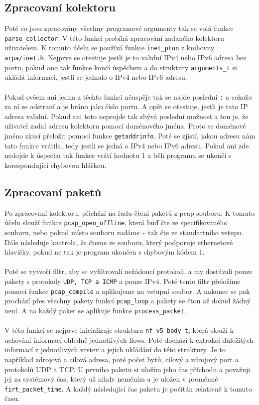 \documentclass[12pt]{article}
\begin{document}
\subsection{Zpracovaní kolektoru}
Poté co jsou zpracovány všechny programové argumenty tak se volá funkce \texttt{parse\_collector}. V této funkci probíhá zpracování zadaného kolektoru uživatelem.
K tomuto účelu se používá funkce \texttt{inet\_pton} z knihovny \texttt{arpa/inet.h}. Nejprve se otestuje jestli je to validní IPv4 nebo IPv6 adresa bez portu, pokud ano
tak funkce končí úspěchem a do struktury \texttt{arguments\_t} si ukládá informaci, jestli se jednalo o IPv4 nebo IPv6 adresu.
\\\\
Pokud ovšem ani jedna z těchto funkci něuspěje tak se najde poslední \texttt{:} a cokoliv za ní se odstraní a je bráno jako číslo portu. A opět se otestuje, jestli je tato IP adresa validní.
Pokud ani toto neprojde tak zbývá poslední možnost a tou je, že uživatel zadal adresu kolektoru pomocí doménového jména.
Proto se doménové jméno zkusí přeložit pomocí funkce \texttt{getaddrinfo}. Poté se zjistí, jakou adresu nám tato funkce vrátila, tedy jestli se jedná o IPv4 nebo IPv6 adresu.
Pokud ani zde nedojde k úspechu tak funkce vrátí hodnotu 1 a běh programu se ukončí s korespondující chybovou hláškou.

\subsection{Zpracovaní paketů}
Po zpracovaní kolektoru, přichází na řadu čtení paketů z pcap souboru. K tomuto účelu slouží funkce \texttt{pcap\_open\_offline}, která buď čte ze specifikovaného souboru, nebo pokud místo souboru zadáme \texttt{-} tak čte ze standartního vstupu.
Dále následuje kontrola, že čteme ze souboru, který podporuje ethernetové hlavičky, pokud ne tak je program ukončen s chybovým kódem 1.
\\\\
Poté se vytvoří filtr, aby se vyfiltrovali nežádoucí protokoli, a my dostávali pouze pakety s protokoly \texttt{UDP, TCP a ICMP} a pouze IPv4. Poté tento filtr přeložíme pomocí funkce \texttt{pcap\_compile} a aplikujeme na vstupní soubor.
A nakonec se pak prochází přes všechny pakety funkcí \texttt{pcap\_loop} a pakety se čtou až dokud žádný není. A na každý paket se aplikuje funkce \texttt{process\_packet}.
\\\\
V této funkci se nejprve inicializuje struktura \texttt{nf\_v5\_body\_t}, která slouží k uchování informací ohledně jednotlivých flows. Poté dochází k extrakci důležitých informací
z jednotlivých vrstev a jejich ukládání do této struktury. Je to například zdrojová a cílová adresa, poté počet bytů, cilový a zdrojový port a protokolů UDP a TCP. U prvního paketu si
uložím jeho čas příchodu a považuji jej za systémový čas, který už nikdy neměním a je uložen v proměnné \texttt{firt\_packet\_time}. A každý následující čas paketu je počítán relativně k tomuto času.
\end{document}
